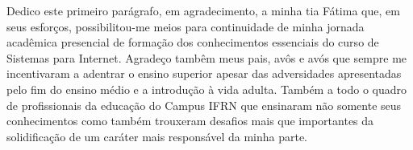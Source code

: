 {\fontsize{12pt}{12pt}\selectfont %
\renewcommand{\agradecimentosname}{\textbf{\fontsize{12pt}{12pt}\selectfont AGRADECIMENTOS}} %

\begin{agradecimentos}
    Dedico este primeiro parágrafo, em agradecimento, a minha tia Fátima
  que, em seus esforços, possibilitou-me meios para continuidade de minha jornada
  acadêmica presencial de formação dos conhecimentos essenciais do curso de Sistemas
  para Internet.
    Agradeço tambêm meus pais, avôs e avós que sempre me incentivaram a adentrar
  o ensino superior apesar das adversidades apresentadas pelo fim do ensino médio
  e a introdução à vida adulta.
    Também a todo o quadro de profissionais da educação do Campus \ac{IFRN} que
  ensinaram não somente seus conhecimentos como também trouxeram desafios mais
  que importantes da solidificação de um caráter mais responsável da minha parte.
    
\end{agradecimentos}}
\newpage
